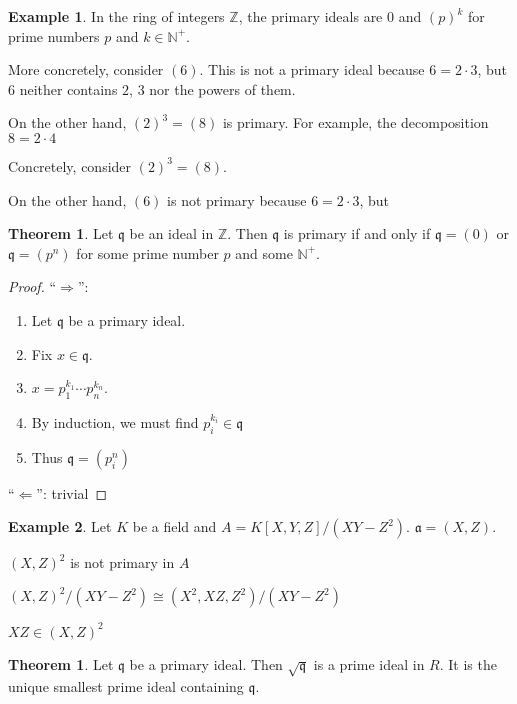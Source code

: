 \documentclass[a4paper]{book}
\theoremstyle{definition}
\newtheorem{example}{Example}[definition]
\newtheorem{theorem}[definition]{Theorem}
\begin{document}
\begin{example}
    In the ring of integers \(\mathbb{Z}\), the primary ideals are \(0\) and \((p)^k\) for prime numbers \(p\) and \(k \in \mathbb{N}^+\).

    More concretely, consider \((6)\). This is not a primary ideal because \(6 = 2 \cdot 3\), but \(6\) neither contains \(2\), \(3\) nor the powers of them.

    On the other hand, \((2)^3 = (8)\) is primary. For example, the decomposition \(8 = 2 \cdot 4\)

    Concretely, consider \((2)^3 = (8)\).

    On the other hand, \((6)\) is not primary because \(6 = 2 \cdot 3\), but
\end{example}


\begin{thmbox}
    \begin{theorem}
        Let \(\mathfrak{q}\) be an ideal in \(\mathbb{Z}\). Then \(\mathfrak{q}\) is primary if and only if \(\mathfrak{q} = (0)\) or \(\mathfrak{q} = (p^n)\) for some prime number \(p\) and some \(\mathbb{N}^+\).
    \end{theorem}
\end{thmbox}
\begin{proof}
    ``\(\Rightarrow\)'':
    \begin{enumerate}
        \item Let \(\mathfrak{q}\) be a primary ideal.
        \item Fix \(x \in \mathfrak{q}\).
        \item \(x = p_1^{k_1} \cdots p_n^{k_n}\).
        \item By induction, we must find \(p_i^{k_i} \in \mathfrak{q}\)
        \item Thus \(\mathfrak{q} = (p_i^n)\)
    \end{enumerate}

    ``\(\Leftarrow\)'': trivial
\end{proof}

\begin{example}
    Let \(K\) be a field and \(A = K[X, Y, Z] / (XY - Z^2)\). \(\mathfrak{a} = (X, Z)\).

    \((X, Z)^2\) is not primary in \(A\)

    \((X, Z)^2 / (XY - Z^2) \cong (X^2, XZ, Z^2) / (XY - Z^2)\)

    \(XZ \in (X, Z)^2\)
\end{example}


\begin{thmbox}
    \begin{theorem}
        Let \(\mathfrak{q}\) be a primary ideal. Then \(\sqrt{\mathfrak{q}}\) is a prime ideal in \(R\). It is the unique smallest prime ideal containing \(\mathfrak{q}\).
    \end{theorem}
\end{thmbox}
\end{document}

